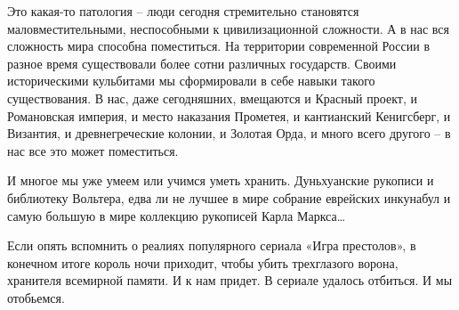 Это какая-то патология – люди сегодня стремительно становятся
маловместительными, неспособными к цивилизационной сложности. А в нас вся
сложность мира способна поместиться. На территории современной России в разное
время существовали более сотни различных государств. Своими историческими
кульбитами мы сформировали в себе навыки такого существования. В нас, даже
сегодняшних, вмещаются и Красный проект, и Романовская империя, и место
наказания Прометея, и кантианский Кенигсберг, и Византия, и древнегреческие
колонии, и Золотая Орда, и много всего другого – в нас все это может
поместиться. 

И многое мы уже умеем или учимся уметь хранить. Дуньхуанские рукописи и
библиотеку Вольтера, едва ли не лучшее в мире собрание еврейских инкунабул и
самую большую в мире коллекцию рукописей Карла Маркса…

Если опять вспомнить о реалиях популярного сериала «Игра престолов», в конечном
итоге король ночи приходит, чтобы убить трехглазого ворона, хранителя всемирной
памяти. И к нам придет. В сериале удалось отбиться. И мы отобьемся. 
